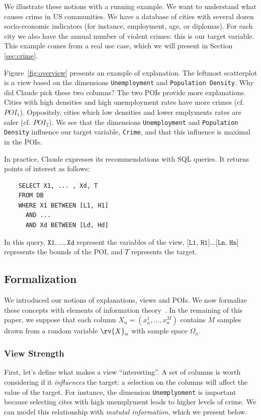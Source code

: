 We illustrate these notions with a running example. We want to understand what
causes crime in US communities. We have a database of cities with several dozen
socio-economic indicators (for instance, employment, age, or diplomas). For
each city we also have the annual number of violent crimes: this is our target
variable. This example comes from a real use case, which we will
present in Section \ref{sec:crime}.

Figure~\ref{fig:overview} presents an example of explanation. The leftmost
scatterplot is a view based on the dimensions \texttt{Unemployment} and
\texttt{Population Density}. Why did Claude pick these two columns? The two
POIs provide more explanations. Cities with high densities and high
unemployment rates have more crimes (cf. $POI_1$). Oppositely, cities which low
densities and lower emplyments rates are safer (cf. $POI_2$). We see that the
dimensions \texttt{Unemployment} and \texttt{Population Density} influence our
target variable, \texttt{Crime}, and that this influence is maximal in the
POIs.

In practice, Claude expresses its recommendations with SQL queries. It returns
points of interest as follows:
\begin{verbatim}
    SELECT X1, ... , Xd, T
    FROM DB
    WHERE X1 BETWEEN [L1, H1]
      AND ... 
      AND Xd BETWEEN [Ld, Hd]
\end{verbatim}
In this query, $\texttt{X1},\ldots, \texttt{Xd}$ represent the variables of the
view, $\texttt{[L1, H1]}\ldots\texttt{[Ln, Hn]}$ represents the bounds of the
POI, and $T$ represents the target.

\subsection{Formalization}
\label{sec:formalization}
We introduced our notions of explanations, views and POIs. We now formalize
these concepts with elements of information theory~\cite{cover2012elements}. In
the remaining of this paper, we suppose that each column $X_n = (x_n^1, \ldots,
x_n^M)$ contains $M$ samples drawn from a random variable $\rv{X}_n$ with
sample space $\Omega_n$.

\subsubsection{View Strength}
\label{sec:view-strength}
First, let's define what makes a view ``interesting''. A set of columns is
worth considering if it \emph{influences} the target: a selection on
the columns will affect the value of the target. For instance, the dimension
\texttt{Unemplyoment} is important because selecting cites with high
unemplyment leads to higher levels of crime. We can model this relationship
with \emph{mututal information}, which we present below.

